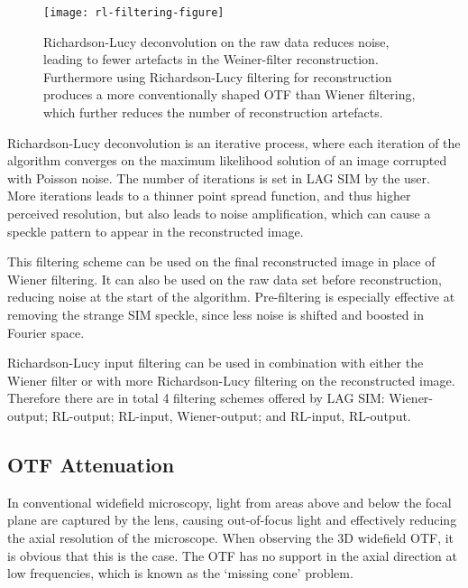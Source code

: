 
\begin{figure}[p]
\centering
\texttt{[image: rl-filtering-figure]}
\caption[LAG SIM: Richardson-Lucy filtering can further reduce SIM reconstruction artefacts]{Richardson-Lucy deconvolution on the raw data reduces noise, leading to fewer artefacts in the Weiner-filter reconstruction. Furthermore using Richardson-Lucy filtering for reconstruction produces a more conventionally shaped OTF than Wiener filtering, which further reduces the number of reconstruction artefacts.}
\label{fig:rl-filtering}
\end{figure}

Richardson-Lucy deconvolution is an iterative process, where each iteration of the algorithm converges on the maximum likelihood solution of an image corrupted with Poisson noise. 
The number of iterations is set in LAG SIM by the user.
More iterations leads to a thinner point spread function, and thus higher perceived resolution, but also leads to noise amplification, which can cause a speckle pattern to appear in the reconstructed image. %

This filtering scheme can be used on the final reconstructed image in place of Wiener filtering. 
It can also be used on the raw data set before reconstruction, reducing noise at the start of the algorithm. 
Pre-filtering is especially effective at removing the strange SIM speckle, since less noise is shifted and boosted in Fourier space. %

Richardson-Lucy input filtering can be used in combination with either the Wiener filter or with more Richardson-Lucy filtering on the reconstructed image. 
Therefore there are in total 4 filtering schemes offered by LAG SIM: Wiener-output; RL-output; RL-input, Wiener-output; and RL-input, RL-output. 

\subsection{OTF Attenuation}
In conventional widefield microscopy, light from areas above and below the focal plane are captured by the lens, causing out-of-focus light and effectively reducing the axial resolution of the microscope. 
When observing the 3D widefield OTF, it is obvious that this is the case. 
The OTF has no support in the axial direction at low frequencies, which is known as the `missing cone' problem. 

